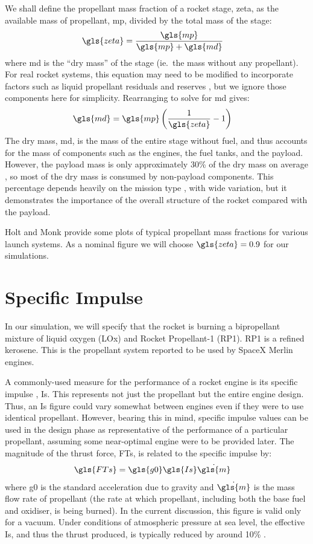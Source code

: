 \documentclass[12pt,openany]{book}
\begin{document}
We shall define the propellant mass fraction of a rocket stage, \gls{zeta}, as the available mass of propellant, \gls{mp}, divided by the total mass of the stage:
\begin{align}
  \gls{zeta} &= \frac{\gls{mp}}{\gls{mp} + \gls{md}}
\end{align}
where \gls{md} is the ``dry mass'' of the stage (ie.\ the mass without any propellant). For real rocket systems, this equation may need to be modified to incorporate factors such as liquid propellant residuals and reserves \cite{holt2009}, but we ignore those components here for simplicity. Rearranging to solve for \gls{md} gives:
\begin{align}
  \gls{md} &= \gls{mp} \left(\frac{1}{\gls{zeta}} - 1\right)
\end{align}
The dry mass, \gls{md}, is the mass of the entire stage without fuel, and thus accounts for the mass of components such as the engines, the fuel tanks, and the payload. However, the payload mass is only approximately 30\% of the dry mass on average \cite{springmann2004}, so most of the dry mass is consumed by non-payload components. This percentage depends heavily on the mission type \cite{gerberich2013}, with wide variation, but it demonstrates the importance of the overall structure of the rocket compared with the payload.

Holt and Monk \cite{holt2009} provide some plots of typical propellant mass fractions for various launch systems. As a nominal figure we will choose \(\gls{zeta}=0.9\) for our simulations.

\section{Specific Impulse}

In our simulation, we will specify that the rocket is burning a bipropellant mixture of liquid oxygen (LOx) and Rocket Propellant-1 (RP1). RP1 is a refined kerosene. This is the propellant system reported to be used by SpaceX Merlin engines.

A commonly-used measure for the performance of a rocket engine is its specific impulse \cite{huzel1967}, \gls{Is}. This represents not just the propellant but the entire engine design. Thus, an \gls{Is} figure could vary somewhat between engines even if they were to use identical propellant. However, bearing this in mind, specific impulse values can be used in the design phase as representative of the performance of a particular propellant, assuming some near-optimal engine were to be provided later. The magnitude of the thrust force, \gls{FTs}, is related to the specific impulse by:
\begin{align}
  \gls{FTs} &= \gls{g0} \gls{Is} \dot{\gls{m}}
  \label{eq:fts-specific-impulse}
\end{align}
where \gls{g0} is the standard acceleration due to gravity and \(\dot{\gls{m}}\) is the mass flow rate of propellant (the rate at which propellant, including both the base fuel and oxidiser, is being burned). In the current discussion, this figure is valid only for a vacuum. Under conditions of atmospheric pressure at sea level, the effective \gls{Is}, and thus the thrust produced, is typically reduced by around 10\% \cite{kephart1971}.
\end{document}

